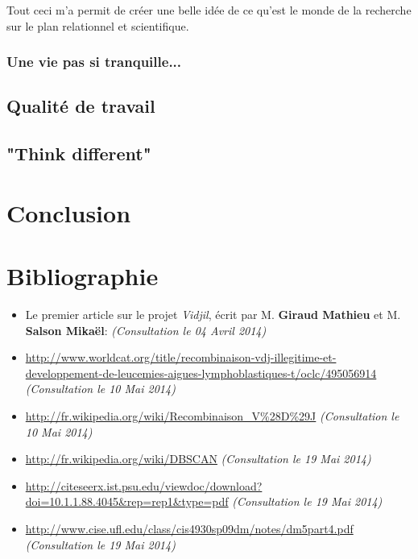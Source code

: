 \documentclass{report}
\begin{document}
Tout ceci m'a permit de créer une belle idée de ce qu'est le monde de la recherche sur le plan relationnel et scientifique.

\subsection{Une vie pas si tranquille...}

\section{Qualité de travail}

\section{"Think different"}


\chapter{Conclusion}


\chapter{Bibliographie}
\begin{itemize}
\item{Le premier article sur le projet \textit{Vidjil}, écrit par M. \textbf{Giraud Mathieu} et M. \textbf{Salson Mikaël}: \url{} \textit{(Consultation le 04 Avril 2014)}}
\item{\url{http://www.worldcat.org/title/recombinaison-vdj-illegitime-et-developpement-de-leucemies-aigues-lymphoblastiques-t/oclc/495056914} \textit{(Consultation le 10 Mai 2014)}}
\item{\url{http://fr.wikipedia.org/wiki/Recombinaison_V%28D%29J} \textit{(Consultation le 10 Mai 2014)}}
\item{\url{http://fr.wikipedia.org/wiki/DBSCAN} \textit{(Consultation le 19 Mai 2014)}}
\item{\url{http://citeseerx.ist.psu.edu/viewdoc/download?doi=10.1.1.88.4045&rep=rep1&type=pdf} \textit{(Consultation le 19 Mai 2014)}}
\item{\url{http://www.cise.ufl.edu/class/cis4930sp09dm/notes/dm5part4.pdf} \textit{(Consultation le 19 Mai 2014)}}
\end{itemize}
\end{document}
